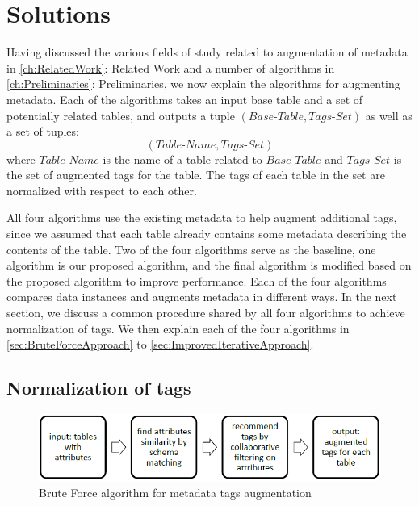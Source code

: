 
\chapter{Solutions}
\label{ch:Solutions}

Having discussed the various fields of study related to augmentation of metadata in \autoref{ch:RelatedWork}: Related Work and a number of algorithms in \autoref{ch:Preliminaries}: Preliminaries, we now explain the algorithms for augmenting metadata. Each of the algorithms takes an input base table and a set of potentially related tables, and outputs a tuple $(\textit{Base-Table}, \textit{Tags-Set})$ as well as a set of tuples:
\[
(\textit{Table-Name},\textit{Tags-Set})
\]
where $\textit{Table-Name}$ is the name of a table related to $\textit{Base-Table}$ and $\textit{Tags-Set}$ is the set of augmented tags for the table. The tags of each table in the set are normalized with respect to each other.


All four algorithms use the existing metadata to help augment additional tags, since we assumed that each table already contains some metadata describing the contents of the table. Two of the four algorithms serve as the baseline, one algorithm is our proposed algorithm, and the final algorithm is modified based on the proposed algorithm to improve performance. Each of the four algorithms compares data instances and augments metadata in different ways. In the next section, we discuss a common procedure shared by all four algorithms to achieve normalization of tags. We then explain each of the four algorithms in \autoref{sec:BruteForceApproach} to \autoref{sec:ImprovedIterativeApproach}.

\section{Normalization of tags}
\label{sec:CommonProcedureForNormalizationOfTags}

\begin{figure}
    \centering
    \includegraphics[width=5in]{figures/brute-force-algorithm.png}
    \caption{Brute Force algorithm for metadata tags augmentation}
    \label{fig:brute-force-algorithm}
\end{figure}

